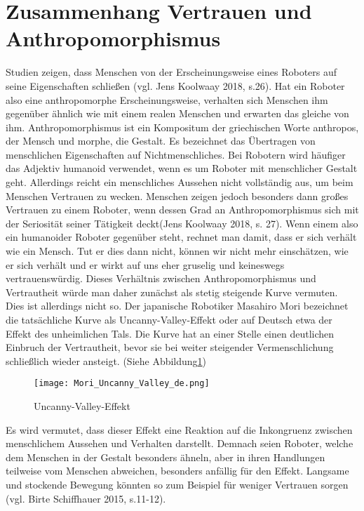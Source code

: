 \documentclass[12pt]{article}
\begin{document}
\section{Zusammenhang Vertrauen und Anthropomorphismus}
Studien zeigen, dass Menschen von der Erscheinungsweise eines Roboters auf seine Eigenschaften schließen (vgl. Jens Koolwaay 2018, s.26). Hat ein Roboter also eine anthropomorphe Erscheinungsweise, verhalten sich Menschen ihm gegenüber ähnlich wie mit einem realen Menschen und erwarten das gleiche von ihm.\newline
Anthropomorphismus ist ein Kompositum der griechischen Worte anthropos, der Mensch und morphe, die Gestalt. Es bezeichnet das Übertragen von menschlichen Eigenschaften auf Nichtmenschliches. Bei Robotern wird häufiger das Adjektiv humanoid verwendet, wenn es um Roboter mit menschlicher Gestalt geht. Allerdings reicht ein menschliches Aussehen nicht vollständig aus, um beim Menschen Vertrauen zu wecken. \glqq Menschen zeigen jedoch besonders dann großes Vertrauen zu einem Roboter, wenn dessen Grad an Anthropomorphismus sich mit der Seriosität seiner Tätigkeit deckt\grqq(Jens Koolwaay 2018, s. 27). Wenn einem also ein humanoider Roboter gegenüber steht, rechnet man damit, dass er sich verhält wie ein Mensch. Tut er dies dann nicht, können wir nicht mehr einschätzen, wie er sich verhält und er wirkt auf uns eher gruselig und keineswegs vertrauenswürdig. Dieses Verhältnis zwischen Anthropomorphismus und Vertrautheit würde man daher zunächst als stetig steigende Kurve vermuten. Dies ist allerdings nicht so. Der japanische Robotiker Masahiro Mori bezeichnet die tatsächliche Kurve als \glqq Uncanny-Valley-Effekt\grqq{} oder auf Deutsch etwa der Effekt des unheimlichen Tals. Die Kurve hat an einer Stelle einen deutlichen Einbruch der Vertrautheit, bevor sie bei weiter steigender Vermenschlichung schließlich wieder ansteigt. (Siehe Abbildung\ref{img:uncanny-valley})
\begin{figure}
\centering
\texttt{[image: Mori\_Uncanny\_Valley\_de.png]}
\caption{Uncanny-Valley-Effekt}
\label{img:uncanny-valley}
\end{figure}
Es wird vermutet, dass dieser Effekt eine Reaktion auf die Inkongruenz zwischen menschlichem Aussehen und Verhalten darstellt. Demnach seien Roboter, welche dem Menschen in der Gestalt besonders ähneln, aber in ihren Handlungen teilweise vom Menschen abweichen, besonders anfällig für den Effekt. Langsame und stockende Bewegung könnten so zum Beispiel für weniger Vertrauen sorgen (vgl. Birte Schiffhauer 2015, s.11-12).\newline
\end{document}
